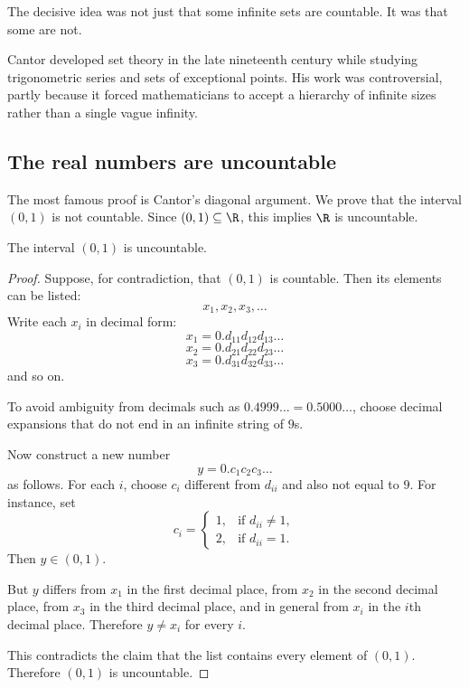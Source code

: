 The decisive idea was not just that some infinite sets are countable. It was that some are not.

\begin{historybox}
Cantor developed set theory in the late nineteenth century while studying trigonometric series and sets of exceptional points. His work was controversial, partly because it forced mathematicians to accept a hierarchy of infinite sizes rather than a single vague infinity.
\end{historybox}

\subsection{The real numbers are uncountable}

The most famous proof is Cantor's diagonal argument. We prove that the interval $(0,1)$ is not countable. Since $(0,1)\subseteq\R$, this implies $\R$ is uncountable.

\begin{theorem}
The interval $(0,1)$ is uncountable.
\end{theorem}

\begin{proof}
Suppose, for contradiction, that $(0,1)$ is countable. Then its elements can be listed:
\[
x_1,x_2,x_3,\ldots
\]
Write each $x_i$ in decimal form:
\[
x_1=0.d_{11}d_{12}d_{13}\ldots
\]
\[
x_2=0.d_{21}d_{22}d_{23}\ldots
\]
\[
x_3=0.d_{31}d_{32}d_{33}\ldots
\]
and so on.

To avoid ambiguity from decimals such as $0.4999\ldots=0.5000\ldots$, choose decimal expansions that do not end in an infinite string of $9$s.

Now construct a new number
\[
y=0.c_1c_2c_3\ldots
\]
as follows. For each $i$, choose $c_i$ different from $d_{ii}$ and also not equal to $9$. For instance, set
\[
c_i=
\begin{cases}
1,&\text{if }d_{ii}\neq1,\\
2,&\text{if }d_{ii}=1.
\end{cases}
\]
Then $y\in(0,1)$.

But $y$ differs from $x_1$ in the first decimal place, from $x_2$ in the second decimal place, from $x_3$ in the third decimal place, and in general from $x_i$ in the $i$th decimal place. Therefore $y\neq x_i$ for every $i$.

This contradicts the claim that the list contains every element of $(0,1)$. Therefore $(0,1)$ is uncountable.
\end{proof}

